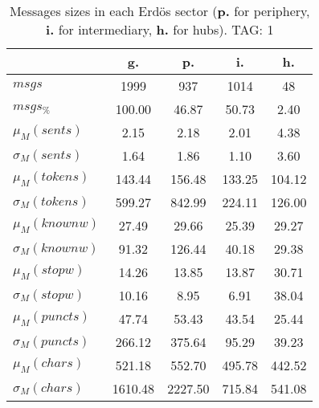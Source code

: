 \begin{table}[h!]
\begin{center}
\begin{tabular}{| l | c | c | c | c |}\hline
 & g. & p. & i. & h. \\\hline
$msgs$ & 1999  & 937  & 1014  & 48 \\\hline
$msgs_{\%}$ & 100.00  & 46.87  & 50.73  & 2.40 \\\hline
$\mu_M(sents)$ & 2.15  & 2.18  & 2.01  & 4.38 \\\hline
$\sigma_M(sents)$ & 1.64  & 1.86  & 1.10  & 3.60 \\\hline
$\mu_M(tokens)$ & 143.44  & 156.48  & 133.25  & 104.12 \\\hline
$\sigma_M(tokens)$ & 599.27  & 842.99  & 224.11  & 126.00 \\\hline
$\mu_M(knownw)$ & 27.49  & 29.66  & 25.39  & 29.27 \\\hline
$\sigma_M(knownw)$ & 91.32  & 126.44  & 40.18  & 29.38 \\\hline
$\mu_M(stopw)$ & 14.26  & 13.85  & 13.87  & 30.71 \\\hline
$\sigma_M(stopw)$ & 10.16  & 8.95  & 6.91  & 38.04 \\\hline
$\mu_M(puncts)$ & 47.74  & 53.43  & 43.54  & 25.44 \\\hline
$\sigma_M(puncts)$ & 266.12  & 375.64  & 95.29  & 39.23 \\\hline
$\mu_M(chars)$ & 521.18  & 552.70  & 495.78  & 442.52 \\\hline
$\sigma_M(chars)$ & 1610.48  & 2227.50  & 715.84  & 541.08 \\\hline
\end{tabular}
\caption{Messages sizes in each Erd\"os sector ({{\bf p.}} for periphery, {{\bf i.}} for intermediary, {{\bf h.}} for hubs). TAG: 1}
\end{center}
\end{table}
